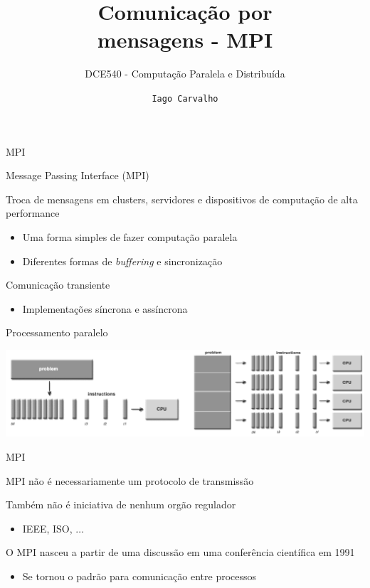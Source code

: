 \documentclass[compress]{beamer}
\title{Comunicação por \\ mensagens - MPI}
\subtitle{DCE540 - Computação Paralela e Distribuída}
\author{\texttt{Iago Carvalho}}
\institute{\texttt{Departamento de Ciência da Computação}}
\begin{document}
\begin{frame}
\titlepage

\end{frame}


\begin{frame}{MPI}

Message Passing Interface (MPI)

\vspace{1cm}

Troca de mensagens em clusters, servidores e dispositivos de computação de alta performance
\begin{itemize}
    \item Uma forma simples de fazer computação paralela
    \item Diferentes formas de \textit{buffering} e sincronização
\end{itemize}

\vspace{1cm}

Comunicação transiente 
\begin{itemize}
    \item Implementações síncrona e assíncrona
\end{itemize}

\end{frame}


\begin{frame}{Processamento paralelo}

\centering\includegraphics[width=\textwidth]{images/computacao_paralela.png}

\end{frame}


\begin{frame}{MPI}

MPI não é necessariamente um protocolo de transmissão

\vspace{0.5cm}

Também não é iniciativa de nenhum orgão regulador
\begin{itemize}
    \item IEEE, ISO, $\ldots$
\end{itemize}

\vspace{0.5cm}

O MPI nasceu a partir de uma discussão em uma conferência científica em 1991
\begin{itemize}
    \item Se tornou o padrão para comunicação entre processos
\end{itemize}
\end{frame}
\end{document}
